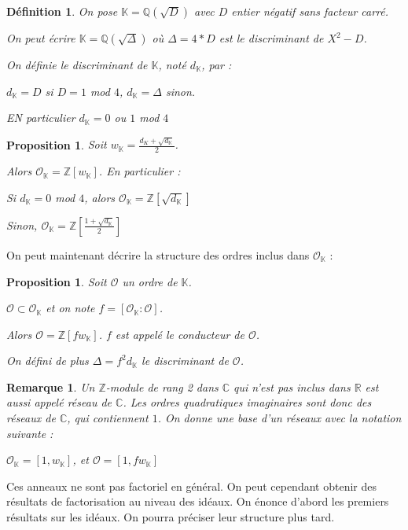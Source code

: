 \documentclass{article}
\newcommand{\Z}[0]{\mathbb{Z}}
\newcommand{\Q}[0]{\mathbb{Q}}
\newcommand{\R}[0]{\mathbb{R}}
\newcommand{\C}[0]{\mathbb{C}}
\newcommand{\K}[0]{\mathbb{K}}
\newcommand{\OR}[0]{\mathcal{O}}
\newtheorem{Prop}[The]{Proposition}
\newtheorem{Def}[The]{Définition}
\newtheorem{Rem}[The]{Remarque}
\begin{document}
\begin{Def}
	On pose $\K = \Q(\sqrt{D})$ avec $D$ entier négatif sans facteur carré. 
	
	On peut écrire $\K = \Q(\sqrt{\Delta})$ où $\Delta = 4*D$ est le discriminant de $X^{2} - D$. 
	
	On définie le discriminant de $\K$, noté $d_{\K}$, par :
	
	$d_{\K} = D$ si $D = 1$ mod $4$, $d_{\K} = \Delta$ sinon.
	
	EN particulier $d_{\K} = 0$ ou $1$ mod $4$
	
\end{Def}

\begin{Prop}
	Soit $w_{\K} = \frac{d_{K} + \sqrt{d_{\K}}}{2}$.
	
	Alors $\OR_{\K} = \Z\left[ w_{\K}\right] $. En particulier :
	
	Si $d_{\K} = 0$ mod $4$, alors $\OR_{\K} = \Z\left[ \sqrt{d_{\K}}\right] $
	
	Sinon, $\OR_{\K} = \Z\left[ \frac{1 + \sqrt{d_{\K}}}{2}\right] $
\end{Prop}

On peut maintenant décrire la structure des ordres inclus dans $\OR_{\K}$ :

\begin{Prop}
	Soit $\OR$ un ordre de $\K$.
	
	 $\OR\subset\OR_{\K}$ et on note $f = \left[ \OR_{\K} : \OR\right]$.
	
	Alors $\OR = \Z\left[ fw_{\K}\right] $. $f$ est appelé le conducteur de $\OR$. 
	
	On défini de plus $\Delta = f^2d_{\K}$ le discriminant de $\OR$. 
\end{Prop}

\begin{Rem}
	Un $\Z$-module de rang 2 dans $\C$ qui n'est pas inclus dans $\R$ est aussi appelé réseau de $\C$. Les ordres quadratiques imaginaires sont donc des réseaux de $\C$, qui contiennent $1$. 
	On donne une base d'un réseaux avec la notation suivante :
	
	$\OR_{\K} = \left[1 , w_{\K}\right]$, et $\OR = \left[ 1, fw_{\K}\right]$
\end{Rem}

Ces anneaux ne sont pas factoriel en général. On peut cependant obtenir des résultats de factorisation au niveau des idéaux.
On énonce d'abord les premiers résultats sur les idéaux. On pourra préciser leur structure plus tard.
\end{document}
